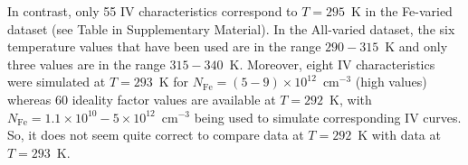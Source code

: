 \documentclass[num-refs]{wiley-article} %
\begin{document}
In contrast, only 55 IV characteristics correspond to $T=295$~K in the Fe-varied dataset
(see Table in Supplementary Material).
In the All-varied dataset,
the six  temperature values that have been used are in the range $290-315$~K and only three values are in the range  $315-340$~K.
Moreover, eight IV characteristics were simulated at $T=293$~K for $N_\mathrm{Fe}=(5-9)\times10^{12}$~cm$^{-3}$
(high values)
whereas 60 ideality factor values are available at $T=292$~K,
with $N_\mathrm{Fe}=1.1\times10^{10}-5\times10^{12}$~cm$^{-3}$ being used to simulate corresponding IV curves.
So, it does not seem quite correct to compare data at  $T=292$~K with data at $T=293$~K.




%


\end{document}
